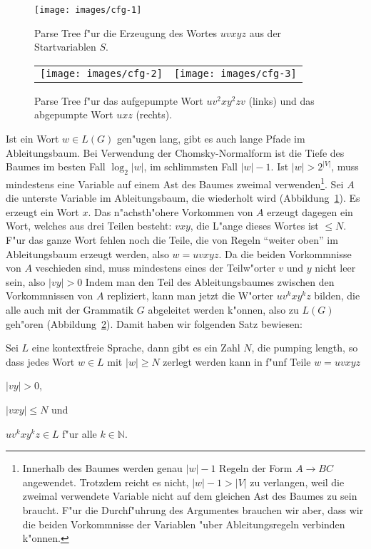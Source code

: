\begin{figure}
\begin{center}
\texttt{[image: images/cfg-1]}
\end{center}
\caption{Parse Tree f"ur die Erzeugung des Wortes $uvxyz$ aus der
Startvariablen $S$.\label{cfg-tree-1}}
\end{figure}
\begin{figure}
\begin{center}
\begin{tabular}{cc}
\texttt{[image: images/cfg-2]}&%
\texttt{[image: images/cfg-3]}\\
\end{tabular}
\end{center}
\caption{Parse Tree f"ur das aufgepumpte Wort $uv^2xy^2zv$ (links) und das
abgepumpte Wort $uxz$ (rechts).\label{cfg-tree-2}}
\end{figure}

Ist ein Wort $w\in L(G)$ gen"ugen lang, gibt es auch lange Pfade im
Ableitungsbaum. Bei Verwendung der Chomsky-Normalform ist die 
Tiefe des Baumes im besten Fall $\log_2 |w|$, im schlimmsten Fall $|w|-1$.
Ist $|w|>2^{|V|}$, muss mindestens eine
Variable auf einem Ast des Baumes zweimal verwenden\footnote{
Innerhalb des Baumes werden genau $|w|-1$ Regeln der
Form $A\to BC$ angewendet.
Trotzdem reicht es nicht, $|w|-1>|V|$ zu verlangen, weil die
zweimal verwendete Variable nicht auf dem gleichen Ast des
Baumes zu sein braucht. F"ur die Durchf"uhrung des Argumentes
brauchen wir aber, dass wir die beiden Vorkommnisse der Variablen
"uber Ableitungsregeln verbinden k"onnen.}.
Sei $A$ die unterste Variable im Ableitungsbaum, die wiederholt
wird (Abbildung~\ref{cfg-tree-1}).
Es erzeugt ein Wort $x$. Das n"achsth"ohere Vorkommen von $A$
erzeugt dagegen ein Wort, welches aus drei Teilen besteht:
$vxy$, die L"ange dieses Wortes ist $\le N$. F"ur das ganze Wort fehlen
noch die Teile, die von Regeln ``weiter oben'' im Ableitungsbaum
erzeugt werden, also $w=uvxyz$.
Da die beiden Vorkommnisse von $A$ veschieden sind, muss mindestens
eines der Teilw"orter $v$ und $y$ nicht leer sein, also $|vy|>0$
Indem man den Teil des Ableitungsbaumes
zwischen den Vorkommnissen von $A$ repliziert, kann man jetzt die
W"orter $uv^kxy^kz$ bilden, die alle auch mit der Grammatik $G$ 
abgeleitet werden k"onnen, also zu $L(G)$ geh"oren (Abbildung~\ref{cfg-tree-2}).
Damit haben wir folgenden Satz bewiesen:

\begin{satz}
Sei $L$ eine kontextfreie Sprache, dann gibt es ein Zahl $N$, die pumping
length, so dass jedes Wort $w\in L$ mit $|w|\ge N$ zerlegt werden
kann in f"unf Teile $w=uvxyz$
\begin{compactenum}
\item
$|vy|>0$,
\item
$|vxy|\le N$ und
\item
$uv^kxy^kz\in L$ f"ur alle $k\in\mathbb N$.
\end{compactenum}
\end{satz}

